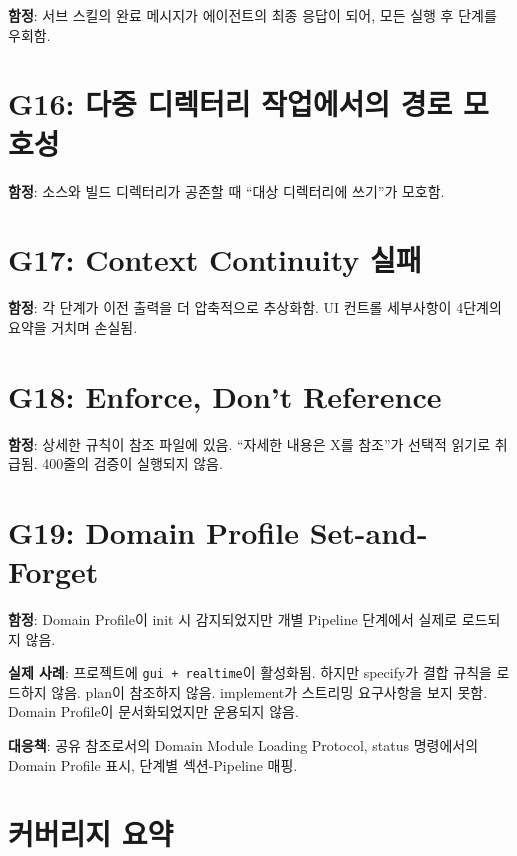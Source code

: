 \documentclass[11pt,a4paper,openright,twoside]{report}
\begin{document}
\textbf{함정}: 서브 스킬의 완료 메시지가 에이전트의 최종 응답이 되어, 모든 실행 후 단계를 우회함.

\section{G16: 다중 디렉터리 작업에서의 경로 모호성}

\textbf{함정}: 소스와 빌드 디렉터리가 공존할 때 ``대상 디렉터리에 쓰기''가 모호함.

\section{G17: Context Continuity 실패}

\textbf{함정}: 각 단계가 이전 출력을 더 압축적으로 추상화함. UI 컨트롤 세부사항이 4단계의 요약을 거치며 손실됨.

\section{G18: Enforce, Don't Reference}

\textbf{함정}: 상세한 규칙이 참조 파일에 있음. ``자세한 내용은 X를 참조''가 선택적 읽기로 취급됨. 400줄의 검증이 실행되지 않음.

\section{G19: Domain Profile Set-and-Forget}

\textbf{함정}: Domain Profile이 init 시 감지되었지만 개별 Pipeline 단계에서 실제로 로드되지 않음.

\textbf{실제 사례}: 프로젝트에 \texttt{gui + realtime}이 활성화됨. 하지만 specify가 결합 규칙을 로드하지 않음. plan이 참조하지 않음. implement가 스트리밍 요구사항을 보지 못함. Domain Profile이 문서화되었지만 운용되지 않음.

\textbf{대응책}: 공유 참조로서의 Domain Module Loading Protocol, status 명령에서의 Domain Profile 표시, 단계별 섹션-Pipeline 매핑.

\section{커버리지 요약}
\end{document}
